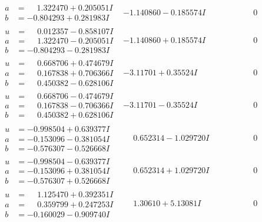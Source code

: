 \documentclass[1p]{elsarticle_modified}
\theoremstyle{definition}
\begin{document}
$$\begin{array}{c|c|c}
\begin{aligned}
a &= \phantom{-}1.322470 + 0.205051 I \\
b &= -0.804293 + 0.281983 I\end{aligned}
 & -1.140860 - 0.185574 I & \phantom{-0.000000 } 0 \\ \hline\begin{aligned}
u &= \phantom{-}0.012357 - 0.858107 I \\
a &= \phantom{-}1.322470 - 0.205051 I \\
b &= -0.804293 - 0.281983 I\end{aligned}
 & -1.140860 + 0.185574 I & \phantom{-0.000000 } 0 \\ \hline\begin{aligned}
u &= \phantom{-}0.668706 + 0.474679 I \\
a &= \phantom{-}0.167838 + 0.706366 I \\
b &= \phantom{-}0.450382 - 0.628106 I\end{aligned}
 & -3.11701 + 0.35524 I & \phantom{-0.000000 } 0 \\ \hline\begin{aligned}
u &= \phantom{-}0.668706 - 0.474679 I \\
a &= \phantom{-}0.167838 - 0.706366 I \\
b &= \phantom{-}0.450382 + 0.628106 I\end{aligned}
 & -3.11701 - 0.35524 I & \phantom{-0.000000 } 0 \\ \hline\begin{aligned}
u &= -0.998504 + 0.639377 I \\
a &= -0.153096 - 0.381054 I \\
b &= -0.576307 - 0.526668 I\end{aligned}
 & \phantom{-}0.652314 - 1.029720 I & \phantom{-0.000000 } 0 \\ \hline\begin{aligned}
u &= -0.998504 - 0.639377 I \\
a &= -0.153096 + 0.381054 I \\
b &= -0.576307 + 0.526668 I\end{aligned}
 & \phantom{-}0.652314 + 1.029720 I & \phantom{-0.000000 } 0 \\ \hline\begin{aligned}
u &= \phantom{-}1.125470 + 0.392351 I \\
a &= \phantom{-}0.359799 + 0.247253 I \\
b &= -0.160029 - 0.909740 I\end{aligned}
 & \phantom{-}1.30610 + 5.13081 I & \phantom{-0.000000 } 0\\

\end{array}$$
\end{document}
